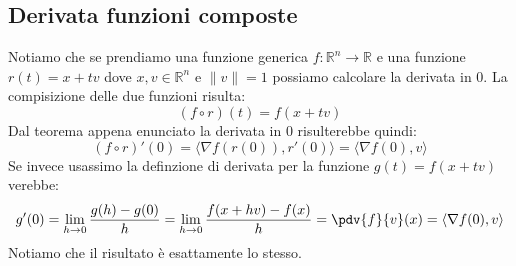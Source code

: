 \subsection{Derivata funzioni composte} \label{theorem_derivateComposte}
Notiamo che se prendiamo una funzione generica $f: \mathbb{R}^n \to 
\mathbb{R}$ e una funzione $r(t) = x + tv$ dove $x, v \in \mathbb{R}^n$ e 
$\lVert v \rVert = 1$ possiamo calcolare la derivata in 0. La compisizione 
delle due funzioni risulta:
\begin{equation*}
	(f \circ r)(t) = f(x + tv) 
\end{equation*}
Dal teorema appena enunciato la derivata in 0 risulterebbe quindi:
\begin{equation*}
	(f \circ r)'(0) = \langle \nabla f(r(0)), r'(0) \rangle = \langle 
	\nabla f(0), v \rangle 
\end{equation*}
Se invece usassimo la definzione di derivata per la funzione $g(t) = f(x + tv)$ 
verebbe:
\begin{equation*}
	g'(0) = \lim_{h \to 0} \dfrac{g(h) - g(0)}{h} = \lim_{h \to 0} 
	\dfrac{f(x + hv) - f(x)}{h} = \pdv{f}{v} (x) = \langle \nabla f(0), v 
	\rangle
\end{equation*}
Notiamo che il risultato è esattamente lo stesso.
